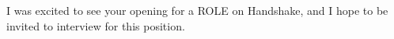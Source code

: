 \begin{cvletter}
	I was excited to see your opening for a ROLE on Handshake, and I hope
	to be invited to interview for this position.
\end{cvletter}
